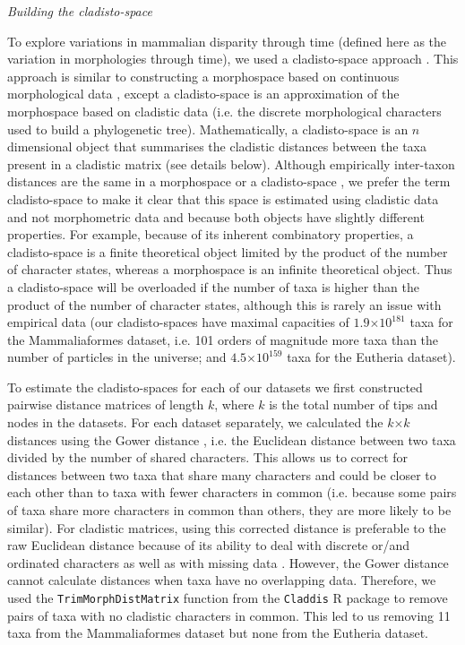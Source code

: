 \documentclass[12pt,letterpaper]{article}
\renewcommand{\subsection}[1]{%
\bigskip
\begin{center}
\begin{large}
\normalfont\itshape #1
\end{large}
\end{center}}
\begin{document}
\subsection{Building the cladisto-space}
To explore variations in mammalian disparity through time (defined here as the variation in morphologies through time), we used a cladisto-space approach \citep[e.g.][]{Foote01071994,Foote29111996,Wesley-Hunt2005,Brusatte12092008,friedmanexplosive2010,toljagictriassic-jurassic2013,Hughes20082013}.
This approach is similar to constructing a morphospace based on continuous morphological data \citep[e.g.][]{friedmanexplosive2010}, except a cladisto-space is an approximation of the morphospace based on cladistic data (i.e. the discrete morphological characters used to build a phylogenetic tree).
Mathematically, a cladisto-space is an $n$ dimensional object that summarises the cladistic distances between the taxa present in a cladistic matrix (see details below).
Although empirically inter-taxon distances are the same in a morphospace or a cladisto-space \citep{foth2012different,hetherington2015cladistic}, we prefer the term cladisto-space to make it clear that this space is estimated using cladistic data and not morphometric data and because both objects have slightly different properties.
For example, because of its inherent combinatory properties, a cladisto-space is a finite theoretical object limited by the product of the number of character states, whereas a morphospace is an infinite theoretical object.
Thus a cladisto-space will be overloaded if the number of taxa is higher than the product of the number of character states, although this is rarely an issue with empirical data (our cladisto-spaces have maximal capacities of $1.9$$\times$$10^{181}$ taxa for the Mammaliaformes dataset, i.e. 101 orders of magnitude more taxa than the number of particles in the universe; and $4.5$$\times$$10^{159}$ taxa for the Eutheria dataset).

To estimate the cladisto-spaces for each of our datasets we first constructed pairwise distance matrices of length $k$, where $k$ is the total number of tips and nodes in the datasets.
For each dataset separately, we calculated the $k$$\times$$k$ distances using the Gower distance \citep{Gower71}, i.e. the Euclidean distance between two taxa divided by the number of shared characters. 
This allows us to correct for distances between two taxa that share many characters and could be closer to each other than to taxa with fewer characters in common (i.e. because some pairs of taxa share more characters in common than others, they are more likely to be similar).
For cladistic matrices, using this corrected distance is preferable to the raw Euclidean distance because of its ability to deal with discrete or/and ordinated characters as well as with missing data \citep{anderson2012using}.
However, the Gower distance cannot calculate distances when taxa have no overlapping data.
Therefore, we used the \texttt{TrimMorphDistMatrix} function from the \texttt{Claddis} R package \citep{Claddis} to remove pairs of taxa with no cladistic characters in common.
This led to us removing 11 taxa from the Mammaliaformes dataset but none from the Eutheria dataset.
\end{document}
